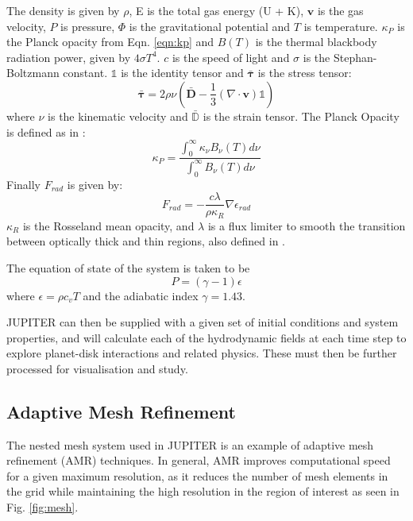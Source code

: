\documentclass[preprint2]{aastex62}
\begin{document}
The density is given by $\rho$, E is the total gas energy (U + K), $\mathbf{v}$ is the gas velocity, $P$ is pressure, $\Phi$ is the gravitational potential and $T$ is temperature. $\kappa_{P}$ is the Planck opacity from Eqn. \ref{eqn:kp} and $B(T)$ is the thermal blackbody radiation power, given by $4\sigma T^{4}$. $c$ is the speed of light and $\sigma$ is the Stephan-Boltzmann constant. $\mathds{1}$ is the identity tensor and $\bm{\bar{\tau}}$ is the stress tensor:
\begin{equation}
\bm{\bar{\tau}} = 2\rho\nu\left(\bm{\bar{D}} - \frac{1}{3}\left(\nabla\cdot\mathbf{v}\right)\mathds{1}\right)
\end{equation}
where $\nu$ is the kinematic velocity and $\mathds{\bar{D}}$ is the strain tensor. 
The Planck Opacity is defined as in \cite{Bitsch2013}:
\begin{equation}\label{eqn:kp}
\kappa_{P} = \frac{\int_{0}^{\infty}\kappa_{\nu}B_{\nu}\left(T\right)d\nu}{\int_{0}^{\infty}B_{\nu}\left(T\right)d\nu}
\end{equation}
Finally $F_{rad}$ is given by:
\begin{equation}
F_{rad} = -\frac{c\lambda}{\rho\kappa_{R}}\nabla\epsilon_{rad}
\end{equation}
$\kappa_{R}$ is the Rosseland mean opacity, and $\lambda$ is a flux limiter to smooth the transition between optically thick and thin regions, also defined in \cite{Bitsch2013}.

The equation of state of the system is taken to be 
\begin{equation}
P = \left(\gamma - 1\right)\epsilon
\end{equation}
where $\epsilon = \rho c_{v}T$ and the adiabatic index $\gamma = 1.43$.

JUPITER can then be supplied with a given set of initial conditions and system properties, and will calculate each of the hydrodynamic fields at each time step to explore planet-disk interactions and related physics. These must then be further processed for visualisation and study.
\subsection{Adaptive Mesh Refinement}\label{sec:amr}
The nested mesh system used in JUPITER is an example of adaptive mesh refinement (AMR) techniques. 
In general, AMR improves computational speed for a given maximum resolution, as it reduces the number of mesh elements in the grid while maintaining the high resolution in the region of interest as seen in Fig. \ref{fig:mesh}. 
\end{document}
